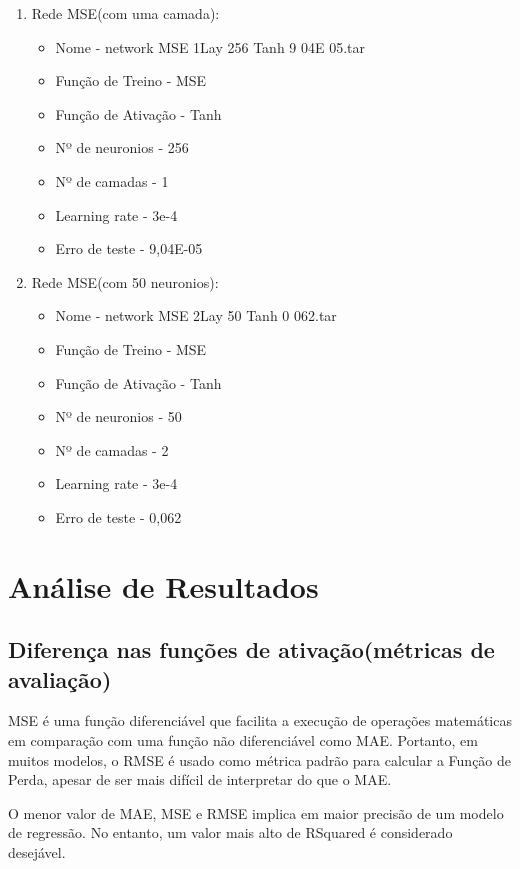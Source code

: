 \documentclass[10pt]{article}
\begin{document}
\begin{enumerate}
\begin{itemize}
  \end{itemize}
  \vspace{1cm}
  \item Rede MSE(com uma camada):
    \begin{itemize}
      \item Nome - network MSE 1Lay 256 Tanh 9 04E 05.tar
      \item Função de Treino - MSE
      \item Função de Ativação - Tanh
      \item Nº de neuronios - 256
      \item Nº de camadas - 1
      \item Learning rate - 3e-4
      \item Erro de teste - 9,04E-05
    \end{itemize}  
    \vspace{1cm}
    \item Rede MSE(com 50 neuronios):
    \begin{itemize}
      \item Nome - network MSE 2Lay 50 Tanh 0 062.tar
      \item Função de Treino - MSE
      \item Função de Ativação - Tanh
      \item Nº de neuronios - 50
      \item Nº de camadas - 2
      \item Learning rate - 3e-4
      \item Erro de teste - 0,062
    \end{itemize}
\end{enumerate}
\newpage

\section{Análise de Resultados}\label{sec:ev-da-org}
\subsection{Diferença nas funções de ativação(métricas de avaliação)}

MSE é uma função diferenciável que facilita a execução de 
operações matemáticas em comparação com uma função 
não diferenciável como MAE. 
Portanto, em muitos modelos, o RMSE é usado como métrica 
padrão para calcular a Função de Perda, apesar de ser mais 
difícil de interpretar do que o MAE.

O menor valor de MAE, MSE e RMSE implica em maior precisão 
de um modelo de regressão. No entanto, um valor mais alto de 
RSquared é considerado desejável.
\end{document}
